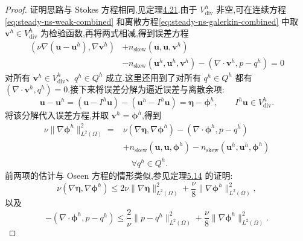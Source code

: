 \begin{proof}
证明思路与 Stokes 方程相同,见定理\hyperref[thm:stokes-error-velocity-h1]{4.21}.由于 $V_{\mathrm{div}}^h$ 非空,可在连续方程\cref{eq:steady-ns-weak-combined} 和离散方程\cref{eq:steady-ns-galerkin-combined} 中取 $\bm{v}^h\in V_{\mathrm{div}}^h$ 为检验函数,再将两式相减,得到误差方程
\[
\begin{aligned}
  (\nu\nabla(\bm{u}-\bm{u}^h),\nabla\bm{v}^h)
   &+n_{\mathrm{skew}}(\bm{u},\bm{u},\bm{v}^h)\\
   &-n_{\mathrm{skew}}(\bm{u}^h,\bm{u}^h,\bm{v}^h)
    -(\nabla\cdot\bm{v}^h,p-q^h)=0
\end{aligned}
\]
对所有 $\bm{v}^h\in V_{\mathrm{div}}^h$、$q^h\in Q^h$ 成立.这里还用到了对所有 $q^h\in Q^h$ 都有 $(\nabla\cdot\bm{v}^h,q^h)=0$.接下来将误差分解为逼近误差与离散余项:
\begin{equation}\label{eq:steady-ns-error-decomposition}
  \bm{u}-\bm{u}^h
    =(\bm{u}-I^h\bm{u})-(\bm{u}^h-I^h\bm{u})
    =\symbf{\eta}-\symbf{\phi}^h,
  \qquad I^h\bm{u}\in V_{\mathrm{div}}^h.
\end{equation}
将该分解代入误差方程,并取 $\bm{v}^h=\symbf{\phi}^h$,得到
\begin{equation}\label{eq:steady-ns-error-energy}
\begin{aligned}
  \nu\|\nabla\symbf{\phi}^h\|_{L^2(\Omega)}^2
   ={}&\nu(\nabla\symbf{\eta},\nabla\symbf{\phi}^h)
      -(\nabla\cdot\symbf{\phi}^h,p-q^h)\\
     &+n_{\mathrm{skew}}(\bm{u},\bm{u},\symbf{\phi}^h)
       -n_{\mathrm{skew}}(\bm{u}^h,\bm{u}^h,\symbf{\phi}^h)\\
   &\quad\forall q^h\in Q^h.
\end{aligned}
\end{equation}
前两项的估计与 Oseen 方程的情形类似,参见定理\hyperref[thm:oseen-fem-velocity-error]{5.14} 的证明:
\[
  \nu(\nabla\symbf{\eta},\nabla\symbf{\phi}^h)
    \le2\nu\|\nabla\symbf{\eta}\|_{L^2(\Omega)}^2
       +\frac{\nu}{8}\|\nabla\symbf{\phi}^h\|_{L^2(\Omega)}^2,
\]
以及
\[
  -(\nabla\cdot\symbf{\phi}^h,p-q^h)
    \le\frac2\nu\|p-q^h\|_{L^2(\Omega)}^2
       +\frac{\nu}{8}\|\nabla\symbf{\phi}^h\|_{L^2(\Omega)}^2.
\]


\end{proof}
